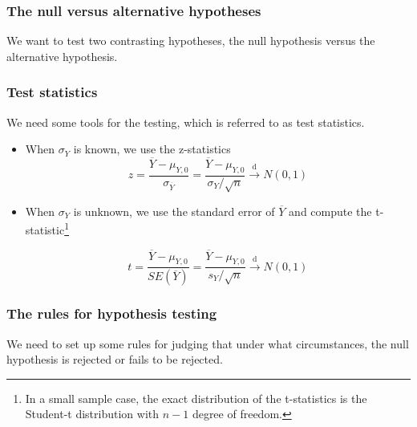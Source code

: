 \documentclass[a4paper,11pt]{article}
\begin{document}
\subsubsection*{The null versus alternative hypotheses}
\label{sec:org413d7d0}

We want to test two contrasting hypotheses, the null hypothesis versus
the alternative hypothesis. 


\subsubsection*{Test statistics}
\label{sec:orgbd03f6b}

We need some tools for the testing, which is referred to as test
statistics.

\begin{itemize}
\item When \(\sigma_Y\) is known, we use the z-statistics
\[ z = \frac{\overline{Y} -
  \mu_{Y,0}}{\sigma_{\overline{Y}}} = \frac{\overline{Y} -
  \mu_{Y,0}}{\sigma_Y/\sqrt{n}} \xrightarrow{\text{ d }} N(0, 1)\]

\item When \(\sigma_Y\) is unknown, we use the standard error of
\(\overline{Y}\) and compute the t-statistic\footnote{In a small sample case, the exact distribution of the
t-statistics is the Student-t distribution with \(n-1\) degree of
freedom.}

\[ t = \frac{\overline{Y} - \mu_{Y,0}}{SE(\overline{Y})} =
  \frac{\overline{Y} - \mu_{Y,0}}{s_Y/\sqrt{n}} \xrightarrow{ \text{ d } } N(0, 1) \]
\end{itemize}

\subsubsection*{The rules for hypothesis testing}
\label{sec:orga492283}

We need to set up some rules for judging that under what
circumstances, the null hypothesis is rejected or fails
to be rejected. 
\end{document}
